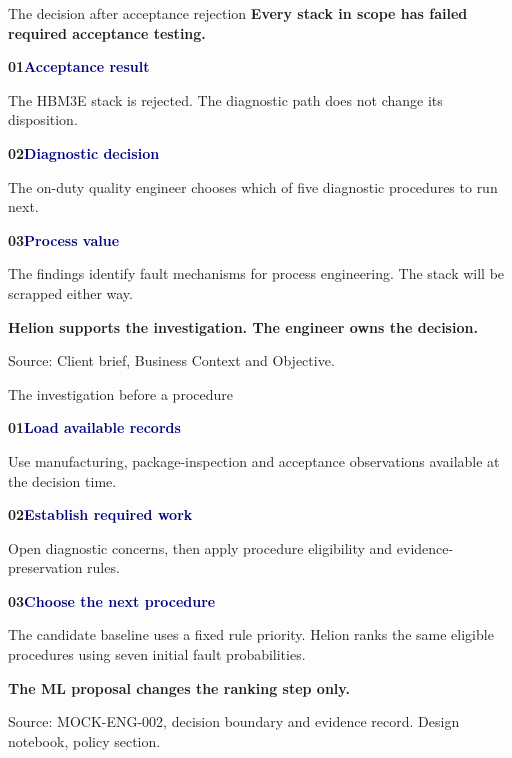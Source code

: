 \documentclass[aspectratio=169,10pt]{beamer}
\newcommand{\source}[1]{\vfill{\fontsize{6.2}{7.5}\selectfont\color{Muted}Source: #1\par}}
\newcommand{\seqitem}[3]{%
  {\normalsize\bfseries\color{Teal}#1\quad\textcolor{Navy}{#2}}\par
  \vspace{0.6mm}
  {\small #3}\par}
\newcommand{\seqrule}{%
  \vspace{1mm}{\color{RuleGrey}\rule{\textwidth}{0.45pt}}\vspace{1mm}}
\begin{document}
\begin{frame}[t]{The decision after acceptance rejection}
  \vspace{1mm}
  {\Large\bfseries Every stack in scope has failed required acceptance testing.}\par
  \vspace{4mm}

  \seqitem{01}{Acceptance result}
    {The HBM3E stack is rejected. The diagnostic path does not change its disposition.}

  \seqrule

  \seqitem{02}{Diagnostic decision}
    {The on-duty quality engineer chooses which of five diagnostic procedures to run next.}

  \seqrule

  \seqitem{03}{Process value}
    {The findings identify fault mechanisms for process engineering. The stack will be scrapped either way.}

  \vspace{3mm}
  {\small\bfseries\color{Amber}Helion supports the investigation. The engineer owns the decision.}

  \source{Client brief, Business Context and Objective.}
\end{frame}

\begin{frame}[t]{The investigation before a procedure}
  \vspace{2mm}

  \seqitem{01}{Load available records}
    {Use manufacturing, package-inspection and acceptance observations available at the decision time.}

  \seqrule

  \seqitem{02}{Establish required work}
    {Open diagnostic concerns, then apply procedure eligibility and evidence-preservation rules.}

  \seqrule

  \seqitem{03}{Choose the next procedure}
    {The candidate baseline uses a fixed rule priority. Helion ranks the same eligible procedures using seven initial fault probabilities.}

  \vspace{3mm}
  {\small\bfseries\color{Amber}The ML proposal changes the ranking step only.}

  \source{MOCK-ENG-002, decision boundary and evidence record. Design notebook, policy section.}
\end{frame}
\end{document}
